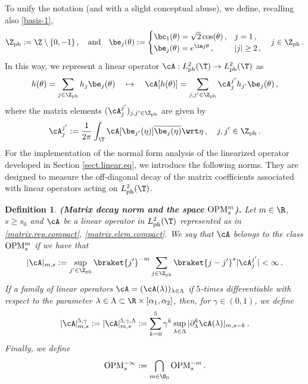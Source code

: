 \documentclass[a4paper,reqno,10pt]{article}
\newtheorem{defi}{Definition}[section]%
\newcommand{\pa}{\partial}
\newcommand{\OpM}{{\rm O}{\rm P}{\rm M}}
\begin{document}
To unify the notation (and with a slight conceptual abuse), we define, recalling also \eqref{basis-1},
\begin{equation}\label{basis.ph}
	\Z_{\rm ph} := \Z\setminus\{0,-1\}\,, \quad \textnormal{and} \quad  \be_{j}(\theta):=\begin{cases}
		\bc_{1}(\theta) =   \sqrt{2}\cos(\theta)\,, & j= 1\,, \\
		\be_{j}(\theta) = e^{\im j\theta}\,, & |j|\geq 2\,,
	\end{cases} \quad j \in\Z_{\rm ph}\,.
\end{equation}
In this way, we represent a linear operator $\cA: L_{\rm ph}^2(\T)\to L_{\rm ph}^2(\T)$ as
\begin{equation}\label{matrix.rep.compact}
	h(\theta)= \sum_{j\in\Z_{\rm ph}} h_{j} \be_{j}(\theta) \quad \mapsto \quad \cA[h(\theta)]=\sum_{j,j'\in\Z_{\rm ph}}\cA_{j}^{j'} h_{j'} \be_{j}(\theta) \,,
\end{equation}
where the matrix elements $(\cA_{j}^{j'})_{j,j'\in\Z_{\rm ph}}$ are given by
\begin{equation}\label{matrix.elem.compact}
	\cA_{j}^{j'} := \frac{1}{2\pi} \int_{\T} \cA[\be_{j'}(\eta)] \overline{\be_{j}(\eta)} \wrt\eta \,, \quad j,j'\in\Z_{\rm ph}\,.
\end{equation}
For the implementation of the normal form analysis of the linearized operator developed in Section \ref{sect.linear.eq}, we introduce the following norms. They are designed to measure the off-diagonal decay of the matrix coefficients associated with linear operators acting on $L_{\rm ph}^2(\T)$.
\begin{defi}\label{block norm}
{\bf (Matrix decay norm and the space $\OpM_{s}^{m}$).} Let $m\in\R$, $s\geq s_0$ and $\cA$ be a linear operator in $L_{\rm ph}^2(\T)$ represented as in \eqref{matrix.rep.compact}, \eqref{matrix.elem.compact}. We say that $\cA$ belongs to the class $\OpM_{s}^m$ if we have that
\begin{equation}\label{def decay norm}
		|\cA|_{m,s} := \sup_{j'\in\Z_{\rm ph}} \braket{j'}^{-m}\sum_{j\in\Z_{\rm ph}} \braket{j-j'}^{s}|\cA_{j}^{j'}|  <\infty \,.
\end{equation}  
If a family of linear operators $\cA=(\cA(\lambda))_{\lambda\in\Lambda}$ if $5$-times differentiable with respect to the parameter $\lambda\in\Lambda \subset \R\times [\alpha_{1},\alpha_{2}]$, then, for $\gamma\in(0,1)$, we define
\begin{equation}
	|\cA|_{m,s}^{5,\gamma} := |\cA|_{m,s}^{5,\gamma,\Lambda} := \sum_{k=0}^{5} \gamma^{k} \sup_{\lambda\in\Lambda} |\pa_{\lambda}^k\cA(\lambda)|_{m,s-k}\,. 
\end{equation}
Finally, we define
\begin{equation}\label{OPM-infty}
    \OpM_{s}^{-\infty} := \bigcap_{m\in\N_{0}} \OpM_{s}^{-m} \,.
\end{equation}
\end{defi}
\end{document}
